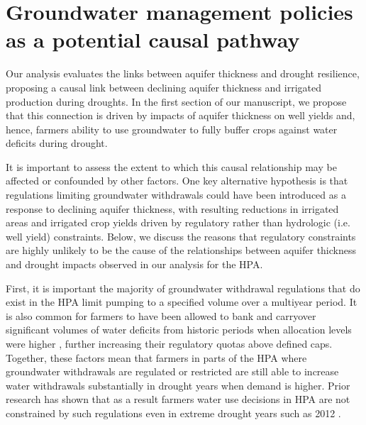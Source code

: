 \documentclass[
]{article}
\begin{document}
\hypertarget{pathway-reg}{%
\section{Groundwater management policies as a potential causal pathway}\label{pathway-reg}}

Our analysis evaluates the links between aquifer thickness and drought resilience, proposing a causal link between declining aquifer thickness and irrigated production during droughts. In the first section of our manuscript, we propose that this connection is driven by impacts of aquifer thickness on well yields and, hence, farmers ability to use groundwater to fully buffer crops against water deficits during drought. 

It is important to assess the extent to which this causal relationship may be affected or confounded by other factors. One key alternative hypothesis is that regulations limiting groundwater withdrawals could have been introduced as a response to declining aquifer thickness, with resulting reductions in irrigated areas and irrigated crop yields driven by regulatory rather than hydrologic (i.e. well yield) constraints. Below, we discuss the reasons that regulatory constraints are highly unlikely to be the cause of the relationships between aquifer thickness and drought impacts observed in our analysis for the HPA. 

First, it is important the majority of groundwater withdrawal regulations that do exist in the HPA limit pumping to a specified volume over a multiyear period. It is also common for farmers to have been allowed to bank and carryover significant volumes of water deficits from historic periods when allocation levels were higher \citep{rimvsaite2023groundwater}, further increasing their regulatory quotas above defined caps. Together, these factors mean that farmers in parts of the HPA where groundwater withdrawals are regulated or restricted are still able to increase water withdrawals substantially in drought years when demand is higher. Prior research has shown that as a result farmers water use decisions in HPA are not constrained by such regulations even in extreme drought years such as 2012 \citep{foster2019assessing}.
\end{document}
